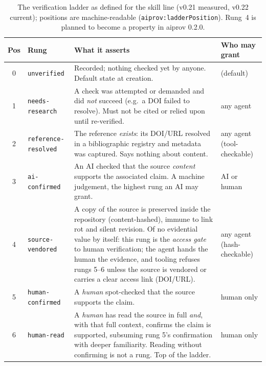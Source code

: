 \begin{table}[t]
\caption{The verification ladder as defined for the skill line (v0.21
measured, v0.22 current); positions are machine-readable
(\texttt{aiprov:ladderPosition}). Rung~4 is planned to become a
property in aiprov 0.2.0.}
\label{tab:ladder}
\centering
\small
\begin{tabular}{clp{8.2cm}l}
\toprule
Pos & Rung & What it asserts & Who may grant \\
\midrule
0 & \texttt{unverified} & Recorded; nothing checked yet by anyone.
    Default state at creation. & (default) \\
1 & \texttt{needs-research} & A check was attempted or demanded and did
    \emph{not} succeed (e.g.\ a DOI failed to resolve). Must not be
    cited or relied upon until re-verified. & any agent \\
2 & \texttt{reference-resolved} & The reference \emph{exists}: its
    DOI/URL resolved in a bibliographic registry and metadata was
    captured. Says nothing about content. & any agent (tool-checkable) \\
3 & \texttt{ai-confirmed} & An AI checked that the source
    \emph{content} supports the associated claim. A machine judgement,
    the highest rung an AI may grant. & AI or human \\
4 & \texttt{source-vendored} & A copy of the source is preserved inside
    the repository (content-hashed), immune to link rot and silent
    revision. Of no evidential value by itself: this rung is the
    \emph{access gate} to human verification; the agent hands the
    human the evidence, and tooling refuses rungs 5--6 unless the
    source is vendored or carries a clear access link (DOI/URL). &
    any agent (hash-checkable) \\
5 & \texttt{human-confirmed} & A \emph{human} spot-checked that the
    source supports the claim. & human only \\
6 & \texttt{human-read} & A \emph{human} has read the source in full
    \emph{and}, with that full context, confirms the claim is
    supported, subsuming rung 5's confirmation with deeper
    familiarity. Reading without confirming is not a rung. Top of the
    ladder. & human only \\
\bottomrule
\end{tabular}
\end{table}

